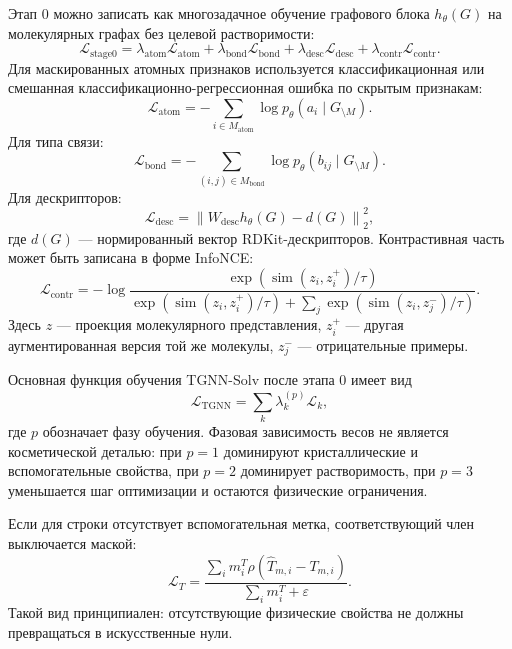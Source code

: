 \documentclass[11pt]{article}
\theoremstyle{definition}
\begin{document}
Этап 0 можно записать как многозадачное обучение графового блока $h_\theta(G)$ на молекулярных графах без целевой растворимости:
\begin{equation*}
    \mathcal L_{\mathrm{stage0}}
    = \lambda_{\mathrm{atom}}\mathcal L_{\mathrm{atom}}
    + \lambda_{\mathrm{bond}}\mathcal L_{\mathrm{bond}}
    + \lambda_{\mathrm{desc}}\mathcal L_{\mathrm{desc}}
    + \lambda_{\mathrm{contr}}\mathcal L_{\mathrm{contr}}.
\end{equation*}
Для маскированных атомных признаков используется классификационная или смешанная классификационно-регрессионная ошибка по скрытым признакам:
\begin{equation*}
    \mathcal L_{\mathrm{atom}}
    = -\sum_{i\in M_{\mathrm{atom}}}\log p_\theta(a_i\mid G_{\setminus M}).
\end{equation*}
Для типа связи:
\begin{equation*}
    \mathcal L_{\mathrm{bond}}
    = -\sum_{(i,j)\in M_{\mathrm{bond}}}\log p_\theta(b_{ij}\mid G_{\setminus M}).
\end{equation*}
Для дескрипторов:
\begin{equation*}
    \mathcal L_{\mathrm{desc}}
    = \left\| W_{\mathrm{desc}} h_\theta(G)-d(G)\right\|_2^2,
\end{equation*}
где $d(G)$ --- нормированный вектор RDKit-дескрипторов. Контрастивная часть может быть записана в форме InfoNCE:
\begin{equation*}
    \mathcal L_{\mathrm{contr}}
    =-\log
    \frac{\exp(\operatorname{sim}(z_i,z_i^+)/\tau)}
    {\exp(\operatorname{sim}(z_i,z_i^+)/\tau)+
     \sum_j\exp(\operatorname{sim}(z_i,z_j^-)/\tau)}.
\end{equation*}
Здесь $z$ --- проекция молекулярного представления, $z_i^+$ --- другая аугментированная версия той же молекулы, $z_j^-$ --- отрицательные примеры.

Основная функция обучения TGNN-Solv после этапа 0 имеет вид
\begin{equation*}
    \mathcal L_{\mathrm{TGNN}}
    = \sum_k \lambda_k^{(p)} \mathcal L_k,
\end{equation*}
где $p$ обозначает фазу обучения. Фазовая зависимость весов не является косметической деталью: при $p=1$ доминируют кристаллические и вспомогательные свойства, при $p=2$ доминирует растворимость, при $p=3$ уменьшается шаг оптимизации и остаются физические ограничения.

Если для строки отсутствует вспомогательная метка, соответствующий член выключается маской:
\begin{equation*}
    \mathcal L_T
    = \frac{\sum_i m_i^T \rho(\widehat T_{m,i}-T_{m,i})}
           {\sum_i m_i^T+\varepsilon}.
\end{equation*}
Такой вид принципиален: отсутствующие физические свойства не должны превращаться в искусственные нули.
\end{document}
